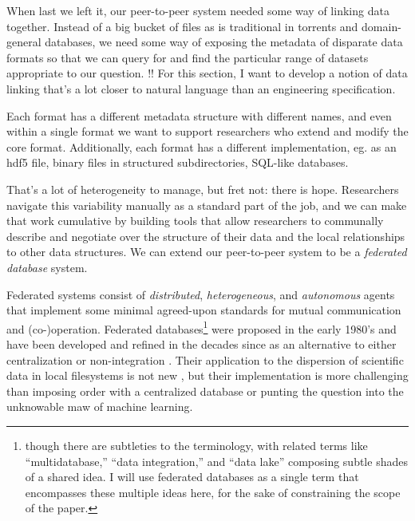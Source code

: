 \documentclass[11pt]{article}
\begin{document}
\begin{multicols}{2}
 When last we left it, our peer-to-peer system needed some
way of linking data together. Instead of a big bucket of files as is
traditional in torrents and domain-general databases, we need some way
of exposing the metadata of disparate data formats so that we can query
for and find the particular range of datasets appropriate to our
question. !! For this section, I want to develop a notion of data
linking that's a lot closer to natural language than an engineering
specification.

Each format has a different metadata structure with different names, and
even within a single format we want to support researchers who extend
and modify the core format. Additionally, each format has a different
implementation, eg. as an hdf5 file, binary files in structured
subdirectories, SQL-like databases.

That's a lot of heterogeneity to manage, but fret not: there is hope.
Researchers navigate this variability manually as a standard part of the
job, and we can make that work cumulative by building tools that allow
researchers to communally describe and negotiate over the structure of
their data and the local relationships to other data structures. We can
extend our peer-to-peer system to be a \emph{federated database} system.

Federated systems consist of \emph{distributed}, \emph{heterogeneous},
and \emph{autonomous} agents that implement some minimal agreed-upon
standards for mutual communication and (co-)operation. Federated
databases\footnote{though there are subtleties to the terminology, with
  related terms like ``multidatabase,'' ``data integration,'' and ``data
  lake'' composing subtle shades of a shared idea. I will use federated
  databases as a single term that encompasses these multiple ideas here,
  for the sake of constraining the scope of the paper.} were proposed in
the early 1980's \cite{heimbignerFederatedArchitectureInformation1985}  and have been
developed and refined in the decades since as an alternative to either
centralization or non-integration \cite{litwinInteroperabilityMultipleAutonomous1990
kashyapSemanticSchematicSimilarities1996
hullManagingSemanticHeterogeneity1997} . Their application to the
dispersion of scientific data in local filesystems is not new \cite{busseFederatedInformationSystems1999
djokic-petrovicPIBASFedSPARQLWebbased2017
hasnainBioFedFederatedQuery2017} , but their implementation is more
challenging than imposing order with a centralized database or punting
the question into the unknowable maw of machine learning.


\end{multicols}
\end{document}
